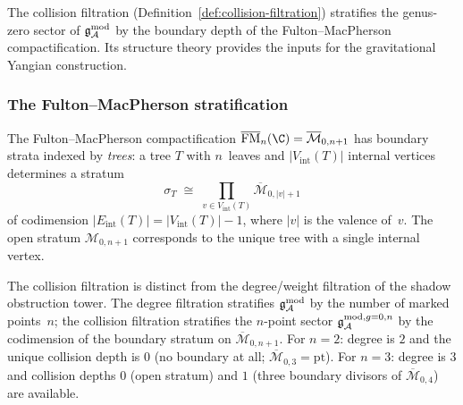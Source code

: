 The collision filtration
(Definition~\ref{def:collision-filtration}) stratifies the
genus-zero sector of $\mathfrak{g}_{\mathcal{A}}^{\mathrm{mod}}$ by the boundary depth of the
Fulton--MacPherson compactification. Its
structure theory provides the inputs for the gravitational
Yangian construction.

\subsubsection{The Fulton--MacPherson stratification}

\begin{definition}
\label{def:thqg-V-fm-boundary}
The Fulton--MacPherson compactification
$\FM_n(\C) = \overline{\mathcal{M}}_{0,n+1}$ has boundary strata
indexed by \emph{trees}: a tree $T$ with $n$~leaves and
$|V_{\mathrm{int}}(T)|$ internal vertices determines a stratum
\begin{equation}\label{eq:thqg-V-fm-stratum}
\sigma_T
\;\cong\;
\prod_{v \in V_{\mathrm{int}}(T)}
\overline{\mathcal{M}}_{0,|v|+1}
\end{equation}
of codimension $|E_{\mathrm{int}}(T)| = |V_{\mathrm{int}}(T)| - 1$,
where $|v|$ is the valence of~$v$. The open stratum
$\mathcal{M}_{0,n+1}$ corresponds to the unique tree with a single
internal vertex.
\end{definition}

\begin{remark}
\label{rem:thqg-V-collision-vs-degree}
The collision filtration is distinct from the degree/weight filtration
of the shadow obstruction tower. The degree filtration stratifies
$\mathfrak{g}_{\mathcal{A}}^{\mathrm{mod}}$ by the number of marked points~$n$; the collision
filtration stratifies the $n$-point sector
$\mathfrak{g}_{\mathcal{A}}^{\mathrm{mod},g{=}0,n}$ by the codimension
of the boundary stratum on $\overline{\mathcal{M}}_{0,n+1}$.
For $n = 2$: degree is $2$ and the unique collision depth is $0$
(no boundary at all; $\overline{\mathcal{M}}_{0,3} = \mathrm{pt}$).
For $n = 3$: degree is $3$ and collision depths $0$ (open stratum)
and $1$ (three boundary divisors of $\overline{\mathcal{M}}_{0,4}$)
are available.
\end{remark}


